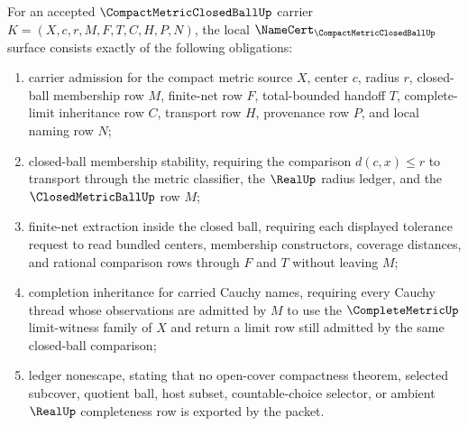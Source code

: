 \begin{theorem}
\label{thm:compact-metric-closed-ball-finite-net-obligations}
For an accepted $\CompactMetricClosedBallUp$ carrier $K=(X,c,r,M,F,T,C,H,P,N)$, the local $\NameCert_{\CompactMetricClosedBallUp}$ surface consists exactly of the following obligations:
\begin{enumerate}
\item carrier admission for the compact metric source $X$, center $c$, radius $r$, closed-ball membership row $M$, finite-net row $F$, total-bounded handoff $T$, complete-limit inheritance row $C$, transport row $H$, provenance row $P$, and local naming row $N$;
\item closed-ball membership stability, requiring the comparison $d(c,x)\leq r$ to transport through the metric classifier, the $\RealUp$ radius ledger, and the $\ClosedMetricBallUp$ row $M$;
\item finite-net extraction inside the closed ball, requiring each displayed tolerance request to read bundled centers, membership constructors, coverage distances, and rational comparison rows through $F$ and $T$ without leaving $M$;
\item completion inheritance for carried Cauchy names, requiring every Cauchy thread whose observations are admitted by $M$ to use the $\CompleteMetricUp$ limit-witness family of $X$ and return a limit row still admitted by the same closed-ball comparison;
\item ledger nonescape, stating that no open-cover compactness theorem, selected subcover, quotient ball, host subset, countable-choice selector, or ambient $\RealUp$ completeness row is exported by the packet.
\end{enumerate}
\end{theorem}
